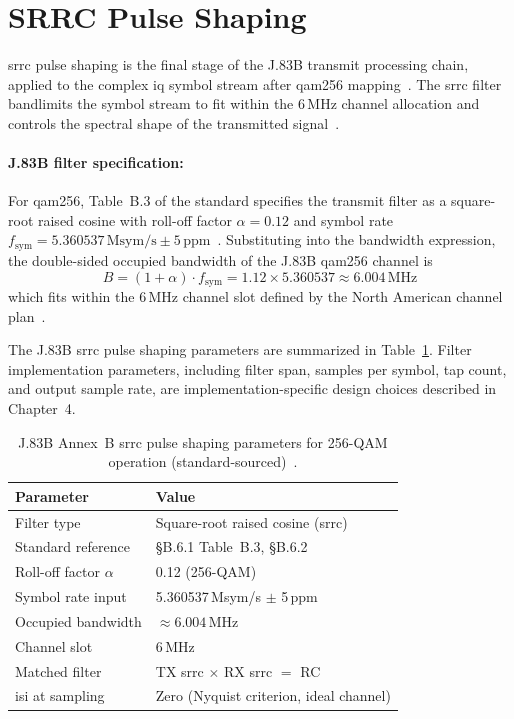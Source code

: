 \section{SRRC Pulse Shaping}
\label{sec:srrc}

\ac{srrc} pulse shaping is the final stage of the J.83B transmit
processing chain, applied to the complex \ac{iq} symbol stream
after \ac{qam256} mapping~\cite{ITU_J83}.
The \ac{srrc} filter bandlimits the symbol stream to fit within
the 6\,MHz channel allocation and controls the spectral shape of
the transmitted signal~\cite{ITU_J83}.

\paragraph{J.83B filter specification:}
For \ac{qam256}, Table~B.3 of the standard specifies the transmit
filter as a square-root raised cosine with roll-off factor
$\alpha = 0.12$ and symbol rate
$f_\text{sym} = 5.360537\,\text{Msym/s} \pm 5\,\text{ppm}$~\cite{ITU_J83}.
Substituting into the bandwidth expression, the double-sided
occupied bandwidth of the J.83B \ac{qam256} channel
is~\cite{ITU_J83}
\begin{equation}
  B = (1 + \alpha) \cdot f_\text{sym}
    = 1.12 \times 5.360537 \approx 6.004\,\text{MHz}
  \label{eq:srrc_bw}
\end{equation}
\noindent which fits within the 6\,MHz channel slot defined by the
North American channel plan~\cite{ITU_J83,SCTE07}.

The J.83B \ac{srrc} pulse shaping parameters are summarized in
Table~\ref{tab:srrc_params}.
Filter implementation parameters, including filter span, samples
per symbol, tap count, and output sample rate, are
implementation-specific design choices described in Chapter~4.

\begin{table}[htbp]
  \caption{J.83B Annex~B \ac{srrc} pulse shaping parameters for
           256-QAM operation (standard-sourced)~\cite{ITU_J83}.}
  \label{tab:srrc_params}
  \centering
  \begin{tabular}{ll}
    \hline
    Parameter              & Value \\
    \hline
    Filter type            & Square-root raised cosine (\ac{srrc}) \\
    Standard reference     & \S B.6.1 Table~B.3, \S B.6.2 \\
    Roll-off factor $\alpha$ & 0.12 (256-QAM) \\
    Symbol rate input      & 5.360537\,Msym/s $\pm$ 5\,ppm \\
    Occupied bandwidth     & $\approx 6.004$\,MHz \\
    Channel slot           & 6\,MHz \\
    Matched filter         & TX \ac{srrc} $\times$ RX \ac{srrc} $=$ RC \\
    \ac{isi} at sampling   & Zero (Nyquist criterion, ideal channel) \\
    \hline
  \end{tabular}
\end{table}